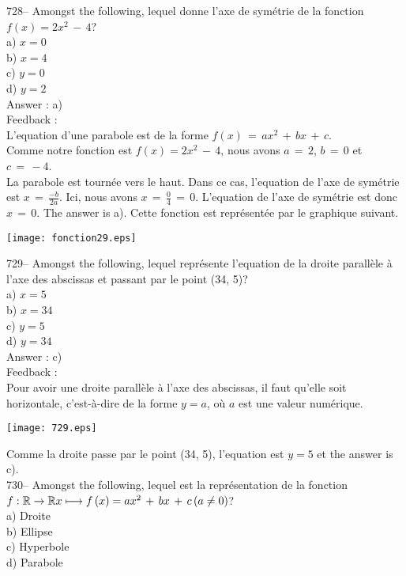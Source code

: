 ﻿\documentclass[letterpaper, 12pt]{article}
\begin{document}
728-- Amongst the following, lequel donne l'axe de sym\'etrie de
la fonction $f(x)= 2x^{2}\,-\,4$?\\
a) $x=0$\\
b) $x=4$\\
c) $y=0$\\
d) $y=2$\\

Answer : a)\\

Feedback : \\
L'equation d'une parabole est de la forme
$f(x)\,=\,ax^2\,+\,bx\,+\,c$.\\
Comme notre fonction est $f(x)= 2x^{2}\,-\,4$, nous avons $a\,=\,2$,
$b\,=\,0$ et $c\,=\,-4$.\\
La parabole est tourn\'ee vers le haut. Dans ce cas, l'equation de
l'axe de sym\'etrie est $x\,=\, \frac{-b}{2a}$. Ici, nous avons
$x\,=\,\frac{0}{4}\,=\,0$. L'equation de l'axe de sym\'etrie est
donc $x\,=\,0$. The answer is a).
Cette fonction est repr\'esent\'ee par le graphique suivant.\\
    \begin{center}
    \texttt{[image: fonction29.eps]}
    \end{center}


729-- Amongst the following, lequel repr\'esente l'equation de
la droite parall\`ele \`a l'axe des abscissas et passant par le point (34,
5)?\\
a) $x=5$\\
b) $x=34$\\
c) $y=5$\\
d) $y=34$\\

Answer : c)\\

Feedback : \\
Pour avoir une droite parall\`ele \`a l'axe des abscissas, il faut
qu'elle soit horizontale, c'est-\`a-dire de la forme $y=a$, o\`u $a$
est une valeur num\'erique.   \begin{center}
    \texttt{[image: 729.eps]}
    \end{center}
     Comme la droite passe par le point (34, 5), l'equation est
$y=5$ et the answer is c).\\


730-- Amongst the following, lequel est la repr\'esentation de la
fonction \\
$f :\mathbb{R}\rightarrow\mathbb{R}\\
x\longmapsto f\left( x\right) =ax^{2}\,+\,bx\,+\,c \left( a\neq 0
\right)$?\\
a) Droite\\
b) Ellipse \\
c) Hyperbole\\
d) Parabole \\
\end{document}
